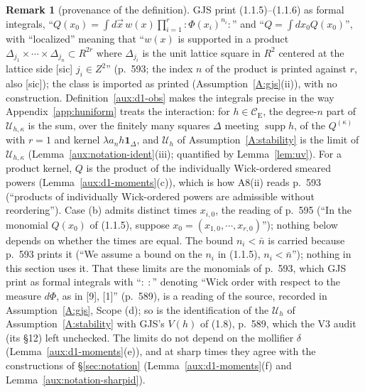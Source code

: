 \documentclass[11pt,a4paper]{article}
\theoremstyle{plain}
\theoremstyle{definition}
\theoremstyle{plain}
\theoremstyle{definition}
\newtheorem{auxrem}[auxlemma]{Remark}
\newcommand{\CE}{\mathcal{C}_{\mathrm E}}
\DeclareMathOperator{\supp}{supp}
\newcommand{\Uc}{\mathcal U}
\begin{document}
\begin{auxrem}[provenance of the definition]\label{aux:d1-def}
GJS print (1.1.5)--(1.1.6) as formal integrals, ``$Q(x_0)=\int d\vec x\,w(x)\prod_{i=1}^r
{:}\Phi(x_i)^{n_i}{:}$'' and ``$Q=\int dx_0Q(x_0)$'', with ``localized'' meaning that ``$w(x)$
is supported in a product $\Delta_{j_1}\times\cdots\times\Delta_{j_n}\subset R^{2r}$ where
$\Delta_{j_i}$ is the unit lattice square in $R^2$ centered at the lattice side [sic]
$j_i\in Z^2$'' (p.~593; the index $n$ of the product is printed against $r$, also [sic]); the
class is imported as printed (Assumption~\ref{A:gjs}(ii)), with no construction.
Definition~\ref{aux:d1-obs} makes the integrals precise in the way
Appendix~\ref{app:huniform} treats the interaction: for $h\in\CE$, the degree-$n$ part of
$\Uc_{h,\kappa}$ is the sum, over the finitely many squares $\Delta$ meeting $\supp h$, of the
$Q^{(\kappa)}$ with $r=1$ and kernel $\lambda a_nh\mathbf 1_\Delta$, and $\Uc_h$ of
Assumption~\ref{A:stability} is the limit of $\Uc_{h,\kappa}$ (Lemma~\ref{aux:notation-ident}(iii);
quantified by Lemma~\ref{lem:uv}). For a product kernel, $Q$ is the product of the individually
Wick-ordered smeared powers (Lemma~\ref{aux:d1-moments}(c)), which is how A8(ii)
reads p.~593 (``products of individually Wick-ordered powers are admissible without
reordering''). Case (b) admits distinct times $x_{i,0}$, the reading of p.~595 (``In the
monomial $Q(x_0)$ of (1.1.5), suppose $x_0=(x_{1,0},\cdots,x_{r,0})$''); nothing below
depends on whether the times are equal. The bound $n_i<\bar n$ is carried because p.~593
prints it (``We assume a bound on the $n_i$ in (1.1.5), $n_i<\bar n$''); nothing in this
section uses it.  That these limits are the monomials of p.~593, which GJS print as formal
integrals with ``${:}\ {:}$'' denoting ``Wick order with respect to the measure $d\Phi$, as in
[9], [1]'' (p.~589), is a reading of the source, recorded in Assumption~\ref{A:gjs}, Scope (d); so is the
identification of the $\Uc_h$ of Assumption~\ref{A:stability} with GJS's $V(h)$ of (1.8),
p.~589, which the V3 audit (its \S12) left unchecked.  The limits do not depend on
the mollifier $\delta$ (Lemma~\ref{aux:d1-moments}(e)), and at sharp times they agree with the
constructions of \S\ref{sec:notation} (Lemma~\ref{aux:d1-moments}(f) and
Lemma~\ref{aux:notation-sharpid}).
\end{auxrem}
\end{document}
